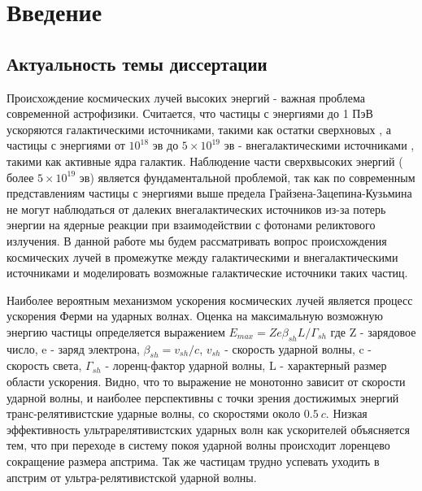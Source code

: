 \chapter*{Введение}					


\section*{Актуальность темы диссертации}

Происхождение космических лучей высоких энергий - важная проблема современной астрофизики. Считается, что частицы с энергиями до 1 ПэВ ускоряются галактическими источниками, такими как остатки сверхновых \cite{Ginzburg1961}, а частицы с энергиями от $10^{18}$ эв до $5\times10^{19}$ эв - внегалактическими источниками \cite{Berezinsky2006}, такими как активные ядра галактик. Наблюдение части сверхвысоких энергий ( более $5\times10^{19}$ эв) является фундаментальной проблемой, так как по современным представлениям частицы с энергиями выше предела Грайзена-Зацепина-Кузьмина не могут наблюдаться от далеких внегалактических источников из-за потерь энергии на ядерные реакции при взаимодействии с фотонами реликтового излучения. В данной работе мы будем рассматривать вопрос происхождения космических лучей в промежутке между галактическими и внегалактическими источниками и моделировать возможные галактические источники таких частиц.

Наиболее вероятным механизмом ускорения космических лучей является процесс ускорения Ферми на ударных волнах. Оценка на максимальную возможную энергию частицы определяется выражением \cite{Lemoine2009} $E_{max}=Ze\beta_{sh}L/\Gamma_{sh}$ где Z - зарядовое число, e - заряд электрона, $\beta_{sh}=v_{sh}/c$, $v_{sh}$ - скорость ударной волны, c - скорость света, $\Gamma_{sh}$ - лоренц-фактор ударной волны, L - характерный размер области ускорения. Видно, что 
то выражение не монотонно зависит от скорости ударной волны, и наиболее перспективны с точки зрения достижимых энергий транс-релятивистские ударные волны, со скоростями около $0.5~c$. Низкая эффективность ультрарелятивистских ударных волн как ускорителей объясняется тем, что при переходе в систему покоя ударной волны происходит лоренцево сокращение размера апстрима. Так же частицам трудно успевать уходить в апстрим от ультра-релятивистской ударной волны.

